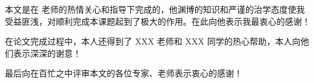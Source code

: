 \begin{thesisacknowlegement}
    本文是在 \theteacher 老师的热情关心和指导下完成的，他渊博的知识和严谨的治学态度使我受益匪浅，对顺利完成本课题起到了极大的作用。在此向他表示我最衷心的感谢！
    
    在论文完成过程中，本人还得到了 XXX 老师和 XXX 同学的热心帮助，本人向他们表示深深的谢意！
    
    最后向在百忙之中评审本文的各位专家、老师表示衷心的感谢！

\end{thesisacknowlegement}